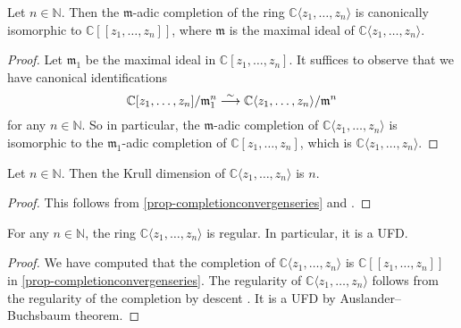 \begin{proposition}\label{prop-completionconvergenseries}
    Let $n\in \mathbb{N}$. Then the $\mathfrak{m}$-adic completion of the ring  $\mathbb{C}\langle z_1,\ldots,z_n \rangle$ is canonically isomorphic to $\mathbb{C}[[ z_1,\ldots,z_n ]]$, where $\mathfrak{m}$ is the maximal ideal of $\mathbb{C}\langle z_1,\ldots,z_n \rangle$. 
\end{proposition}
\begin{proof}
    Let $\mathfrak{m}_1$ be the maximal ideal in $\mathbb{C}[z_1,\ldots,z_n]$. It suffices to observe that we have canonical identifications
    \[
        \mathbb{C}[z_1,\ldots,z_n]/\mathfrak{m}_1^n\stackrel{\sim}{\longrightarrow} \mathbb{C}\langle z_1,\ldots,z_n\rangle/\mathfrak{m}^n
    \]
    for any $n\in \mathbb{N}$. So in particular, the $\mathfrak{m}$-adic completion of $\mathbb{C}\langle z_1,\ldots,z_n \rangle$ is isomorphic to the $\mathfrak{m}_1$-adic completion of $\mathbb{C}[z_1,\ldots,z_n]$, which is $\mathbb{C}\langle z_1,\ldots,z_n \rangle$.
\end{proof}

\begin{corollary}
    Let $n\in \mathbb{N}$. Then the Krull dimension of $\mathbb{C}\langle z_1,\ldots,z_n \rangle$ is $n$.
\end{corollary}
\begin{proof}
    This follows from \cref{prop-completionconvergenseries} and \cite[\href{https://stacks.math.columbia.edu/tag/07NV}{Tag 07NV}]{stacks-project}.
\end{proof}

\begin{thm}\label{thm-convpowerregular}
    For any $n\in \mathbb{N}$, the ring $\mathbb{C}\langle z_1,\ldots,z_n \rangle$ is regular. In particular, it is a UFD.
\end{thm}
\begin{proof}
    We have computed that the completion of $\mathbb{C}\langle z_1,\ldots,z_n \rangle$ is $\mathbb{C}[[ z_1,\ldots,z_n ]]$ in \cref{prop-completionconvergenseries}. The regularity of $\mathbb{C}\langle z_1,\ldots,z_n \rangle$ follows from the regularity of the completion by descent \cite[\href{https://stacks.math.columbia.edu/tag/07NY}{Tag 07NY}]{stacks-project}. It is a UFD by Auslander--Buchsbaum theorem.
\end{proof}


